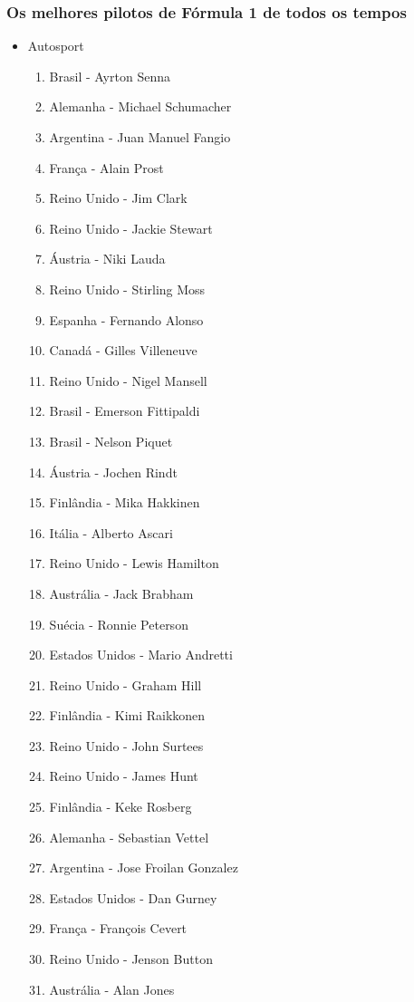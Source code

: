\documentclass[a4paper,10pt]{article}
\begin{document}
\subsubsection{Os melhores pilotos de Fórmula 1 de todos os tempos}
\begin{itemize}
\item Autosport
\begin{enumerate}
\item Brasil - Ayrton Senna
\item Alemanha - Michael Schumacher
\item Argentina - Juan Manuel Fangio
\item França - Alain Prost
\item Reino Unido - Jim Clark
\item Reino Unido - Jackie Stewart
\item Áustria - Niki Lauda
\item Reino Unido - Stirling Moss
\item Espanha - Fernando Alonso
\item Canadá - Gilles Villeneuve
\item Reino Unido - Nigel Mansell
\item Brasil - Emerson Fittipaldi
\item Brasil - Nelson Piquet
\item Áustria - Jochen Rindt
\item Finlândia - Mika Hakkinen
\item Itália - Alberto Ascari
\item Reino Unido - Lewis Hamilton
\item Austrália - Jack Brabham
\item Suécia - Ronnie Peterson
\item Estados Unidos - Mario Andretti
\item Reino Unido - Graham Hill
\item Finlândia - Kimi Raikkonen
\item Reino Unido - John Surtees
\item Reino Unido - James Hunt
\item Finlândia - Keke Rosberg
\item Alemanha - Sebastian Vettel
\item Argentina - Jose Froilan Gonzalez
\item Estados Unidos - Dan Gurney
\item França - François Cevert
\item Reino Unido - Jenson Button
\item Austrália - Alan Jones

\end{enumerate}
\end{itemize}
\end{document}
